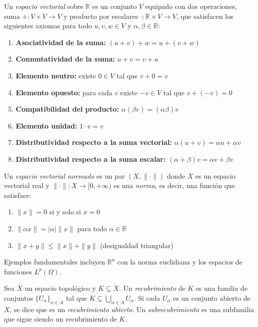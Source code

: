 \begin{definition}\label{def:espacio_vectorial}
	Un \textit{espacio vectorial} sobre $\mathbb{R}$ es un conjunto $V$ equipado con dos operaciones, suma $+: V \times V \to V$ y producto por escalares $\cdot: \mathbb{R} \times V \to V$, que satisfacen los siguientes axiomas para todo $u, v, w \in V$ y $\alpha, \beta \in \mathbb{R}$:
	\begin{enumerate}
		\item \textbf{Asociatividad de la suma:} $(u + v) + w = u + (v + w)$
		\item \textbf{Conmutatividad de la suma:} $u + v = v + u$
		\item \textbf{Elemento neutro:} existe $0 \in V$ tal que $v + 0 = v$
		\item \textbf{Elemento opuesto:} para cada $v$ existe $-v \in V$ tal que $v + (-v) = 0$
		\item \textbf{Compatibilidad del producto:} $\alpha(\beta v) = (\alpha\beta)v$
		\item \textbf{Elemento unidad:} $1 \cdot v = v$
		\item \textbf{Distributividad respecto a la suma vectorial:} $\alpha(u + v) = \alpha u + \alpha v$
		\item \textbf{Distributividad respecto a la suma escalar:} $(\alpha + \beta)v = \alpha v + \beta v$
	\end{enumerate}
\end{definition}

\begin{definition}\label{def:espacio_normado}
	Un \textit{espacio vectorial normado} es un par $(X, \|\cdot\|)$ donde $X$ es un espacio vectorial real y $\|\cdot\|: X \to [0, +\infty)$ es una \textit{norma}, es decir, una función que satisface:
	\begin{enumerate}
		\item $\|x\| = 0$ si y solo si $x = 0$
		\item $\|\alpha x\| = |\alpha| \|x\|$ para todo $\alpha \in \mathbb{R}$
		\item $\|x + y\| \leq \|x\| + \|y\|$ (desigualdad triangular)
	\end{enumerate}
\end{definition}

Ejemplos fundamentales incluyen $\mathbb{R}^n$ con la norma euclidiana y los espacios de funciones $L^p(\Omega)$.

\begin{definition}[Recubrimiento]\label{def:recubrimiento}
	Sea $X$ un espacio topológico y $K \subseteq X$. Un \textit{recubrimiento} de $K$ es una familia de conjuntos $\{U_\alpha\}_{\alpha \in A}$ tal que $K \subseteq \bigcup_{\alpha \in A} U_\alpha$. Si cada $U_\alpha$ es un conjunto abierto de $X$, se dice que es un \textit{recubrimiento abierto}. Un \textit{subrecubrimiento} es una subfamilia que sigue siendo un recubrimiento de $K$.
\end{definition}

